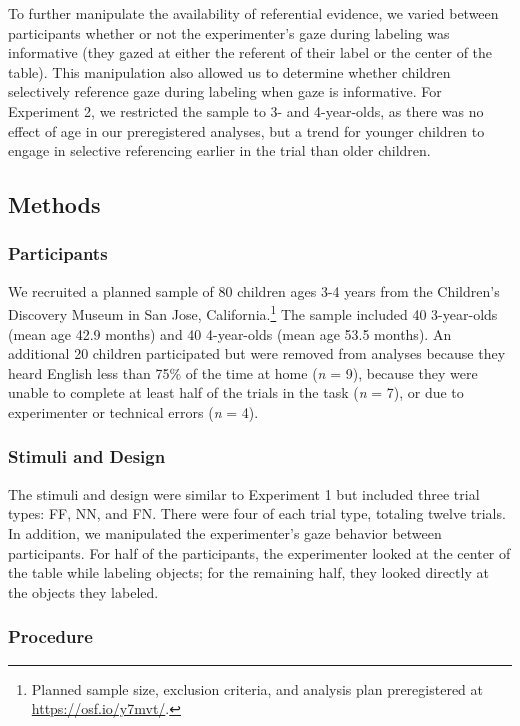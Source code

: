 \documentclass[a4paper,man,apacite,floatsintext]{apa6}
\begin{document}
To further manipulate the availability of referential evidence, we
varied between participants whether or not the experimenter's gaze
during labeling was informative (they gazed at either the referent of
their label or the center of the table). This manipulation also allowed
us to determine whether children selectively reference gaze during
labeling when gaze is informative. For Experiment 2, we restricted the
sample to 3- and 4-year-olds, as there was no effect of age in our
preregistered analyses, but a trend for younger children to engage in
selective referencing earlier in the trial than older children.

\subsection{Methods}\label{methods-1}

\subsubsection{Participants}\label{participants-1}

We recruited a planned sample of 80 children ages 3-4 years from the
Children's Discovery Museum in San Jose, California.\footnote{Planned
  sample size, exclusion criteria, and analysis plan preregistered at
  \url{https://osf.io/y7mvt/}.} The sample included 40 3-year-olds (mean
age 42.9 months) and 40 4-year-olds (mean age 53.5 months). An
additional 20 children participated but were removed from analyses
because they heard English less than 75\% of the time at home (\emph{n}
= 9), because they were unable to complete at least half of the trials
in the task (\emph{n} = 7), or due to experimenter or technical errors
(\emph{n} = 4).

\subsubsection{Stimuli and Design}\label{stimuli-and-design-1}

The stimuli and design were similar to Experiment 1 but included three
trial types: FF, NN, and FN. There were four of each trial type,
totaling twelve trials. In addition, we manipulated the experimenter's
gaze behavior between participants. For half of the participants, the
experimenter looked at the center of the table while labeling objects;
for the remaining half, they looked directly at the objects they
labeled.

\subsubsection{Procedure}\label{procedure-1}
\end{document}
